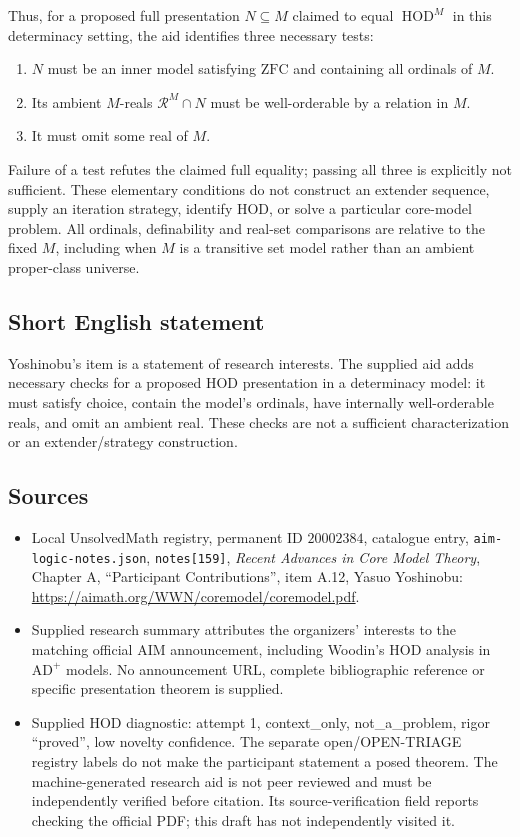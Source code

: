 \documentclass[11pt]{article}
\begin{document}
Thus, for a proposed full presentation \(N\subseteq M\) claimed to equal \(\operatorname{HOD}^M\) in this determinacy setting, the aid identifies three necessary tests:
\begin{enumerate}
\item \(N\) must be an inner model satisfying \(\mathrm{ZFC}\) and containing all ordinals of \(M\).
\item Its ambient \(M\)-reals \(\mathcal R^M\cap N\) must be well-orderable by a relation in \(M\).
\item It must omit some real of \(M\).
\end{enumerate}
Failure of a test refutes the claimed full equality; passing all three is explicitly not sufficient. These elementary conditions do not construct an extender sequence, supply an iteration strategy, identify HOD, or solve a particular core-model problem. All ordinals, definability and real-set comparisons are relative to the fixed \(M\), including when \(M\) is a transitive set model rather than an ambient proper-class universe.
\subsection{Short English statement}
Yoshinobu's item is a statement of research interests. The supplied aid adds necessary checks for a proposed HOD presentation in a determinacy model: it must satisfy choice, contain the model's ordinals, have internally well-orderable reals, and omit an ambient real. These checks are not a sufficient characterization or an extender/strategy construction.
\subsection{Sources}
\begin{itemize}
\item Local UnsolvedMath registry, permanent ID \(20002384\), catalogue entry, \texttt{aim-logic-notes.json}, \texttt{notes[159]}, \emph{Recent Advances in Core Model Theory}, Chapter A, ``Participant Contributions'', item A.12, Yasuo Yoshinobu: \url{https://aimath.org/WWN/coremodel/coremodel.pdf}.
\item Supplied research summary attributes the organizers' interests to the matching official AIM announcement, including Woodin's HOD analysis in \(\mathrm{AD}^{+}\) models. No announcement URL, complete bibliographic reference or specific presentation theorem is supplied.
\item Supplied HOD diagnostic: attempt 1, context\_only, not\_a\_problem, rigor ``proved'', low novelty confidence. The separate open/OPEN-TRIAGE registry labels do not make the participant statement a posed theorem. The machine-generated research aid is not peer reviewed and must be independently verified before citation. Its source-verification field reports checking the official PDF; this draft has not independently visited it.
\end{itemize}
\end{document}
